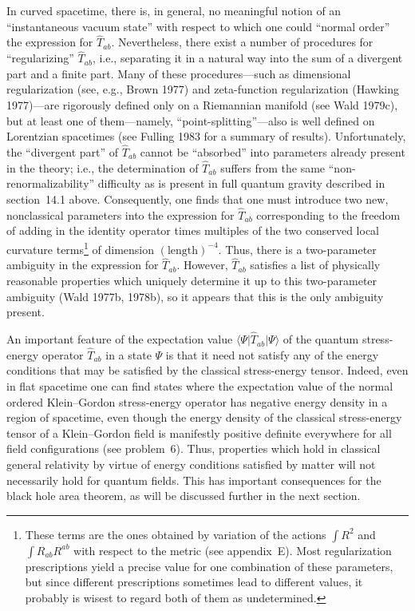 In curved spacetime, there is, in general, no meaningful notion of an ``instantaneous
vacuum state'' with respect to which one could ``normal order'' the expression for
\(\widehat T_{ab}\). Nevertheless, there exist a number of procedures for
``regularizing'' \(\widehat T_{ab}\), i.e., separating it in a natural way into the sum
of a divergent part and a finite part. Many of these procedures---such as dimensional
regularization (see, e.g., Brown 1977) and zeta-function regularization (Hawking
1977)---are rigorously defined only on a Riemannian manifold (see Wald 1979c), but
at least one of them---namely, ``point-splitting''---also is well defined on Lorentzian
spacetimes (see Fulling 1983 for a summary of results). Unfortunately, the
``divergent part'' of \(\widehat T_{ab}\) cannot be ``absorbed'' into parameters
already present in the theory; i.e., the determination of \(\widehat T_{ab}\) suffers
from the same ``non-renormalizability'' difficulty as is present in full quantum
gravity described in section~14.1 above. Consequently, one finds that one must
introduce two new, nonclassical parameters into the expression for
\(\widehat T_{ab}\) corresponding to the freedom of adding in the identity operator
times multiples of the two conserved local curvature terms\footnote{These terms are
the ones obtained by variation of the actions \(\int R^2\) and
\(\int R_{ab}R^{ab}\) with respect to the metric (see appendix~E). Most
regularization prescriptions yield a precise value for one combination of these
parameters, but since different prescriptions sometimes lead to different values, it
probably is wisest to regard both of them as undetermined.} of dimension
\((\text{length})^{-4}\). Thus, there is a two-parameter ambiguity in the expression
for \(\widehat T_{ab}\). However, \(\widehat T_{ab}\) satisfies a list of physically
reasonable properties which uniquely determine it up to this two-parameter
ambiguity (Wald 1977b, 1978b), so it appears that this is the only ambiguity present.

An important feature of the expectation value
\(\langle\Psi\rvert\widehat T_{ab}\lvert\Psi\rangle\) of the quantum
stress-energy operator \(\widehat T_{ab}\) in a state \(\Psi\) is that it need not
satisfy any of the energy conditions that may be satisfied by the classical
stress-energy tensor. Indeed, even in flat spacetime one can find states where the
expectation value of the normal ordered Klein--Gordon stress-energy operator has
negative energy density in a region of spacetime, even though the energy density of
the classical stress-energy tensor of a Klein--Gordon field is manifestly positive
definite everywhere for all field configurations (see problem~6). Thus, properties
which hold in classical general relativity by virtue of energy conditions satisfied by
matter will not necessarily hold for quantum fields. This has important consequences
for the black hole area theorem, as will be discussed further in the next section.

